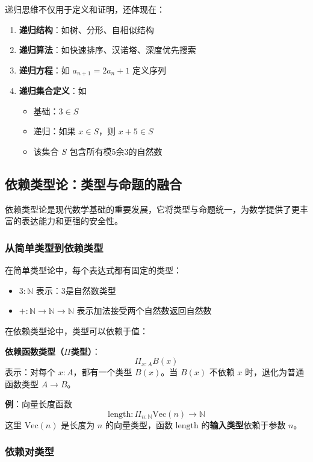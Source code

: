\documentclass[12pt,a4paper,UTF8]{ctexart}
\begin{document}
递归思维不仅用于定义和证明，还体现在：

\begin{enumerate}
    \item \textbf{递归结构}：如树、分形、自相似结构
    \item \textbf{递归算法}：如快速排序、汉诺塔、深度优先搜索
    \item \textbf{递归方程}：如 $a_{n+1} = 2a_n + 1$ 定义序列
    \item \textbf{递归集合定义}：如
    \begin{itemize}
        \item 基础：$3 \in S$
        \item 递归：如果 $x \in S$，则 $x+5 \in S$
        \item 该集合 $S$ 包含所有模5余3的自然数
    \end{itemize}
\end{enumerate}

\subsection{依赖类型论：类型与命题的融合}

\qquad 依赖类型论是现代数学基础的重要发展，它将类型与命题统一，为数学提供了更丰富的表达能力和更强的安全性。

\subsubsection{从简单类型到依赖类型}

在简单类型论中，每个表达式都有固定的类型：
\begin{itemize}
    \item $3 : \mathbb{N}$ 表示：3是自然数类型
    \item $+ : \mathbb{N} \to \mathbb{N} \to \mathbb{N}$ 表示加法接受两个自然数返回自然数
\end{itemize}

在依赖类型论中，类型可以依赖于值：

\textbf{依赖函数类型（$\Pi$类型）}：
$$\Pi_{x:A} B(x)$$
表示：对每个 $x:A$，都有一个类型 $B(x)$。当 $B(x)$ 不依赖 $x$ 时，退化为普通函数类型 $A \to B$。

\textbf{例}：向量长度函数
$$\mathrm{length} : \Pi_{n:\mathbb{N}} \mathrm{Vec}(n) \to \mathbb{N}$$
这里 $\mathrm{Vec}(n)$ 是长度为 $n$ 的向量类型，函数 $\mathrm{length}$ 的\textbf{输入类型}依赖于参数 $n$。

\subsubsection{依赖对类型}
\end{document}
